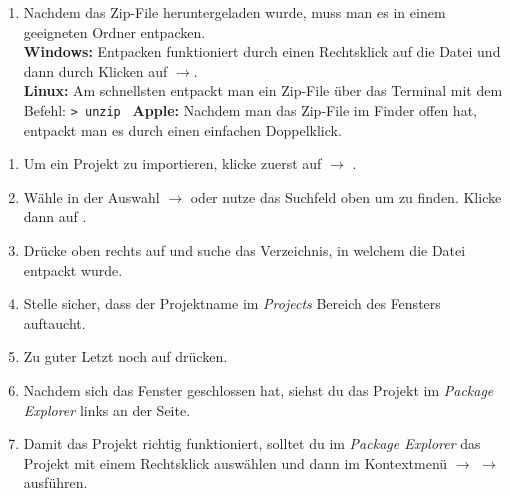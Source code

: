 
\label{ex1}

\begin{Infobox}
    \begin{enumerate}[label=\arabic*.]

        \item Nachdem das Zip-File \jvkpackage heruntergeladen wurde, muss man es in einem geeigneten Ordner entpacken.\\
        \textbf{Windows:} Entpacken funktioniert durch einen Rechtsklick auf die Datei und dann durch Klicken auf $\to$.\\
        \textbf{Linux:} Am schnellsten entpackt man ein Zip-File über das Terminal mit dem Befehl:
        \newline\hspace*{\fill}\texttt{\textgreater\ unzip \jvkpackage}\hspace*{\fill}\newline
        \textbf{Apple:} Nachdem man das Zip-File im Finder offen hat, entpackt man es durch einen einfachen Doppelklick.
    \end{enumerate}
\end{Infobox}


\begin{Infobox}
    \begin{enumerate}[label=\arabic*.]
        \item Um ein Projekt zu importieren, klicke zuerst auf  $\to$ .
        \item Wähle in der Auswahl  $\to$  oder nutze das Suchfeld oben um  zu finden. Klicke dann auf .
        \item Drücke oben rechts auf  und suche das Verzeichnis, in welchem die Datei \jvkpackage { }entpackt wurde.
        \item Stelle sicher, dass der Projektname im \textit{Projects} Bereich des Fensters auftaucht.
        \item Zu guter Letzt noch auf  drücken.
        \item Nachdem sich das Fenster geschlossen hat, siehst du das Projekt im \textit{Package Explorer} links an der Seite.
        \item Damit das Projekt richtig funktioniert, solltet du im \textit{Package Explorer} das Projekt mit einem Rechtsklick auswählen und dann im Kontextmenü  $\to$  $\to$  ausführen.
    \end{enumerate}
\end{Infobox}


